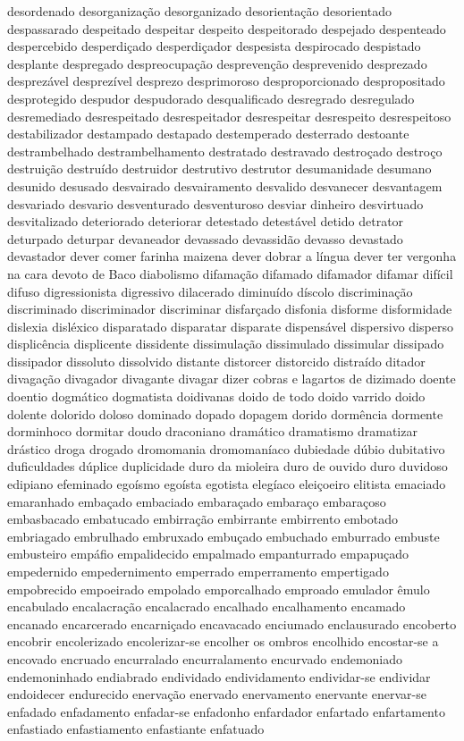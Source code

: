 \begin{appendices}
desordenado desorganiza\c{c}\~ao desorganizado desorienta\c{c}\~ao desorientado despassarado despeitado despeitar despeito despeitorado despejado despenteado despercebido desperdi\c{c}ado desperdi\c{c}ador despesista despirocado despistado desplante despregado despreocupa\c{c}\~ao despreven\c{c}\~ao desprevenido desprezado desprez\'{a}vel desprez\'{i}vel desprezo desprimoroso desproporcionado despropositado desprotegido despudor despudorado desqualificado desregrado desregulado desremediado desrespeitado desrespeitador desrespeitar desrespeito desrespeitoso destabilizador destampado destapado destemperado desterrado destoante destrambelhado destrambelhamento destratado destravado destro\c{c}ado destro\c{c}o destrui\c{c}\~ao destru\'{i}do destruidor destrutivo destrutor desumanidade desumano desunido desusado desvairado desvairamento desvalido desvanecer desvantagem desvariado desvario desventurado desventuroso desviar dinheiro desvirtuado desvitalizado deteriorado deteriorar detestado detest\'{a}vel detido detrator deturpado deturpar devaneador devassado devassid\~ao devasso devastado devastador dever comer farinha maizena dever dobrar a l\'{i}ngua dever ter vergonha na cara devoto de Baco diabolismo difama\c{c}\~ao difamado difamador difamar dif\'{i}cil difuso digressionista digressivo dilacerado diminu\'{i}do d\'{i}scolo discrimina\c{c}\~ao discriminado discriminador discriminar disfar\c{c}ado disfonia disforme disformidade dislexia disl\'{e}xico disparatado disparatar disparate dispens\'{a}vel dispersivo disperso displic\^{e}ncia displicente dissidente dissimula\c{c}\~ao dissimulado dissimular dissipado dissipador dissoluto dissolvido distante distorcer distorcido distra\'{i}do ditador divaga\c{c}\~ao divagador divagante divagar dizer cobras e lagartos de dizimado doente doentio dogm\'{a}tico dogmatista doidivanas doido de todo doido varrido doido dolente dolorido doloso dominado dopado dopagem dorido dorm\^{e}ncia dormente dorminhoco dormitar doudo draconiano dram\'{a}tico dramatismo dramatizar dr\'{a}stico droga drogado dromomania dromoman\'{i}aco dubiedade d\'{u}bio dubitativo duficuldades d\'{u}plice duplicidade duro da mioleira duro de ouvido duro duvidoso edipiano efeminado ego\'{i}smo ego\'{i}sta egotista eleg\'{i}aco elei\c{c}oeiro elitista emaciado emaranhado emba\c{c}ado embaciado embara\c{c}ado embara\c{c}o embara\c{c}oso embasbacado embatucado embirra\c{c}\~ao embirrante embirrento embotado embriagado embrulhado embruxado embu\c{c}ado embuchado emburrado embuste embusteiro emp\'{a}fio empalidecido empalmado empanturrado empapu\c{c}ado empedernido empedernimento emperrado emperramento empertigado empobrecido empoeirado empolado emporcalhado emproado emulador \^{e}mulo encabulado encalacra\c{c}\~ao encalacrado encalhado encalhamento encamado encanado encarcerado encarni\c{c}ado encavacado enciumado enclausurado encoberto encobrir encolerizado encolerizar-se encolher os ombros encolhido encostar-se a encovado encruado encurralado encurralamento encurvado endemoniado endemoninhado endiabrado endividado endividamento endividar-se endividar endoidecer endurecido enerva\c{c}\~ao enervado enervamento enervante enervar-se enfadado enfadamento enfadar-se enfadonho enfardador enfartado enfartamento enfastiado enfastiamento enfastiante enfatuado 
\end{appendices}

